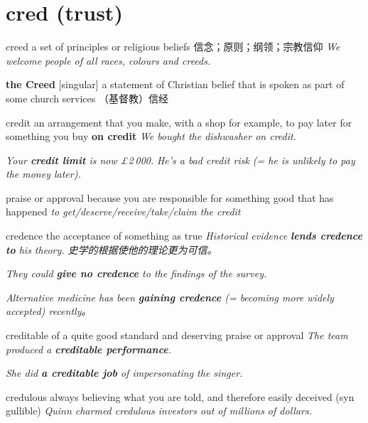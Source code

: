 \section{cred (trust)}

\begin{DefWord}{creed}
    a set of principles or religious beliefs 信念；原则；纲领；宗教信仰
    \textit{We welcome people of all races, colours and creeds.}

    \textbf{the Creed} [singular] a statement of Christian belief that is spoken as part of some church services （基督教）信经
\end{DefWord}

\begin{DefWord}{credit}
    an arrangement that you make, with a shop for example, to pay later for something you buy
    \textbf{on credit} \textit{We bought the dishwasher on credit.}

    \textit{Your \textbf{credit limit} is now £2 000.}
    \textit{He's a bad credit risk (= he is unlikely to pay the money later).}

    praise or approval because you are responsible for something good that has happened
    \textit{to get/deserve/receive/take/claim the credit}
\end{DefWord}

\begin{DefWord}{credence}
    the acceptance of something as true
    \textit{Historical evidence \textbf{lends credence to} his theory. 史学的根据使他的理论更为可信。}

    \textit{They could \textbf{give no credence} to the findings of the survey.}

    \textit{Alternative medicine has been \textbf{gaining credence} (= becoming more widely accepted) recently。}
\end{DefWord}

\begin{DefWord}{creditable}
    of a quite good standard and deserving praise or approval
    \textit{The team produced a \textbf{creditable performance}.}

    \textit{She did \textbf{a creditable job} of impersonating the singer.}
\end{DefWord}

\begin{DefWord}{credulous}
    always believing what you are told, and therefore easily deceived (syn gullible)
    \textit{Quinn charmed credulous investors out of millions of dollars.}
\end{DefWord}

